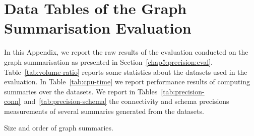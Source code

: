 \chapter{Data Tables of the Graph Summarisation Evaluation}

In this Appendix, we report the raw results of the evaluation conducted on the graph summarisation as presented in Section~\ref{chap5:precision:eval}. Table~\ref{tab:volume-ratio} reports some statistics about the datasets used in the evaluation. In Table~\ref{tab:cpu-time} we report performance results of computing summaries over the datasets. We report in Tables~\ref{tab:precision-conn}~and~\ref{tab:precision-schema} the \gls{connectivity} and \gls{schema} precisions measurements of several summaries generated from the datasets.

\begin{table}
	\centering
	\resizebox{\textwidth}{!}{
		
	}
	\caption{Size and order of graph summaries.}
	\label{tab:volume-ratio}
\end{table}

\begin{table}
	\centering
	\resizebox{\textwidth}{!}{
		
	}
	\caption[Computational performance of graph summaries creation]{Performance comparison. We report the CPU time in $ms$ of the \emph{edges} step in the graph summarisation computation. For each category of dataset complexity, we report the mean $\mu$ of the CPU time.%
	}
	\label{tab:cpu-time}
\end{table}






